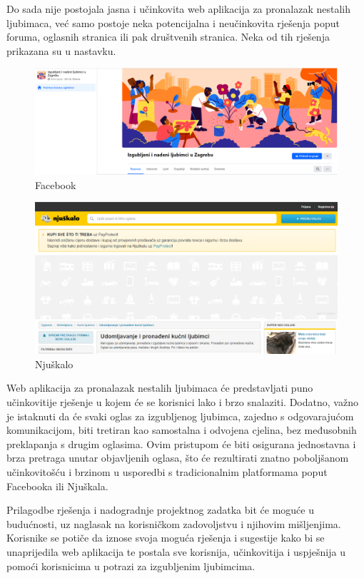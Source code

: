 		Do sada nije postojala jasna i učinkovita web aplikacija za pronalazak nestalih ljubimaca, već samo postoje neka potencijalna i neučinkovita rješenja poput foruma, oglasnih stranica ili pak društvenih stranica. Neka od tih rješenja prikazana su u nastavku.
	
		\begin{figure}[H]
			\centering
			\includegraphics[scale=0.3]{slike/Facebook-nestaliLjubimci.PNG}
			\caption{Facebook}
			\label{fig:promjene}
		\end{figure}
	
		\begin{figure}[H]
			\centering
			\includegraphics[scale=0.3]{slike/Njuskalo-nestaliLjubimci.PNG}
			\caption{Njuškalo}
			\label{fig:promjene}
		\end{figure}
		
		Web aplikacija za pronalazak nestalih ljubimaca će predstavljati puno učinkovitije rješenje u kojem će se korisnici lako i brzo snalaziti. Dodatno, važno je istaknuti da će svaki oglas za izgubljenog ljubimca, zajedno s odgovarajućom komunikacijom, biti tretiran kao samostalna i odvojena cjelina, bez međusobnih preklapanja s drugim oglasima. Ovim pristupom će biti osigurana jednostavna i brza pretraga unutar objavljenih oglasa, što će rezultirati znatno poboljšanom učinkovitošću i brzinom u usporedbi s tradicionalnim platformama poput Facebooka ili Njuškala.
		
		Prilagodbe rješenja i nadogradnje projektnog zadatka bit će moguće u budućnosti, uz naglasak na korisničkom zadovoljstvu i njihovim mišljenjima. Korisnike se potiče da iznose svoja moguća rješenja i sugestije kako bi se unaprijedila web aplikacija te postala sve korisnija, učinkovitija i uspješnija u pomoći korisnicima u potrazi za izgubljenim ljubimcima.
		
		\eject
		
		
	